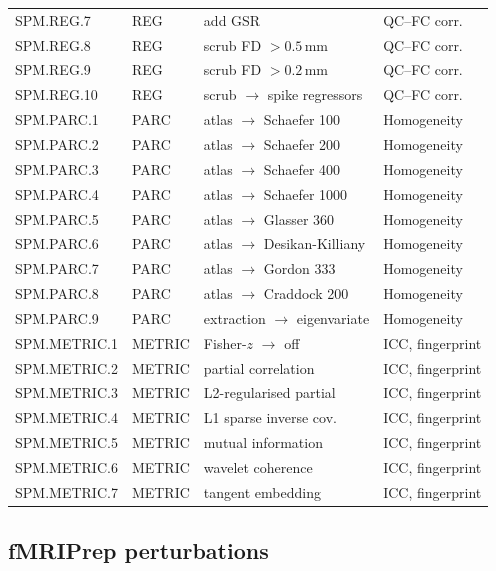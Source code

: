 \documentclass[11pt,a4paper]{article}
\begin{document}
\begin{longtable}{@{}llll@{}}
SPM.REG.7  & REG & add GSR                       & QC--FC corr. \\
SPM.REG.8  & REG & scrub FD $> 0.5$\,mm          & QC--FC corr. \\
SPM.REG.9  & REG & scrub FD $> 0.2$\,mm          & QC--FC corr. \\
SPM.REG.10 & REG & scrub $\to$ spike regressors  & QC--FC corr. \\
\midrule
SPM.PARC.1  & PARC & atlas $\to$ Schaefer 100    & Homogeneity \\
SPM.PARC.2  & PARC & atlas $\to$ Schaefer 200    & Homogeneity \\
SPM.PARC.3  & PARC & atlas $\to$ Schaefer 400    & Homogeneity \\
SPM.PARC.4  & PARC & atlas $\to$ Schaefer 1000   & Homogeneity \\
SPM.PARC.5  & PARC & atlas $\to$ Glasser 360     & Homogeneity \\
SPM.PARC.6  & PARC & atlas $\to$ Desikan-Killiany & Homogeneity \\
SPM.PARC.7  & PARC & atlas $\to$ Gordon 333      & Homogeneity \\
SPM.PARC.8  & PARC & atlas $\to$ Craddock 200    & Homogeneity \\
SPM.PARC.9  & PARC & extraction $\to$ eigenvariate & Homogeneity \\
\midrule
SPM.METRIC.1 & METRIC & Fisher-$z$ $\to$ off     & ICC, fingerprint \\
SPM.METRIC.2 & METRIC & partial correlation       & ICC, fingerprint \\
SPM.METRIC.3 & METRIC & L2-regularised partial    & ICC, fingerprint \\
SPM.METRIC.4 & METRIC & L1 sparse inverse cov.    & ICC, fingerprint \\
SPM.METRIC.5 & METRIC & mutual information        & ICC, fingerprint \\
SPM.METRIC.6 & METRIC & wavelet coherence         & ICC, fingerprint \\
SPM.METRIC.7 & METRIC & tangent embedding         & ICC, fingerprint \\
\end{longtable}


\subsection{fMRIPrep perturbations}
\end{document}
